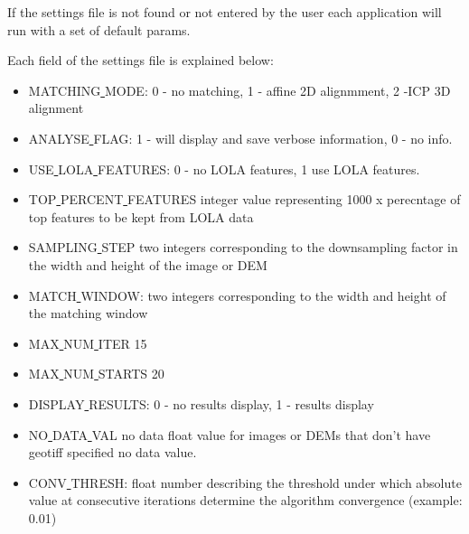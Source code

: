 \documentclass[12pt]{article}
\begin{document}
If the settings file is not found or not entered by the user each application will run with a set of default params.

Each field of the settings file is explained below:
\begin{itemize}
\item{MATCHING\underline{ }MODE}: 0 - no matching, 1 - affine 2D alignmment, 2 -ICP 3D alignment\\
\item{ANALYSE\underline{ }FLAG}:  1 - will display and save verbose information, 0 - no info.\\
\item{USE\underline{ }LOLA\underline{ }FEATURES}: 0 - no LOLA features, 1 use LOLA features.\\ 
\item{TOP\underline{ }PERCENT\underline{ }FEATURES} integer value representing 1000 x perecntage of top features to be kept from LOLA data\\
\item{SAMPLING\underline{ }STEP} two integers corresponding to the downsampling factor in the width and height of the image or DEM\\
\item{MATCH\underline{ }WINDOW}: two integers corresponding to the width and height of the matching window\\
\item{MAX\underline{ }NUM\underline{ }ITER} 15\\
\item{MAX\underline{ }NUM\underline{ }STARTS} 20\\
\item{DISPLAY\underline{ }RESULTS}: 0 - no results display, 1 - results display\\
\item{NO\underline{ }DATA\underline{ }VAL} no data float value for images or DEMs that don't have geotiff specified no data value.\\
\item{CONV\underline{ }THRESH}: float number describing the threshold under which absolute value at consecutive iterations determine 
                                the algorithm convergence (example: 0.01)\\
\end{itemize}
\end{document}
